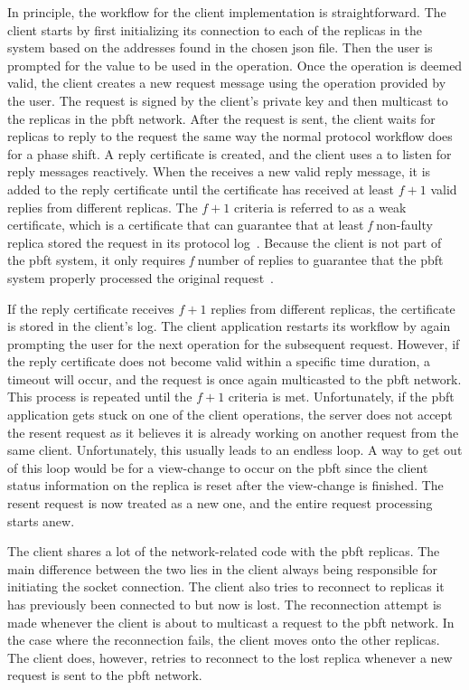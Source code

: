 In principle, the workflow for the client implementation is straightforward. The client starts by first initializing its connection to each of the replicas in the system based on the addresses found in the chosen \ac{json} file. Then the user is prompted for the value to be used in the operation. Once the operation is deemed valid, the client creates a new request message using the operation provided by the user. The request is signed by the client’s private key and then multicast to the replicas in the \ac{pbft} network. After the request is sent, the client waits for replicas to reply to the request the same way the normal protocol workflow does for a phase shift. A reply certificate is created, and the client uses a  to listen for reply messages reactively. When the  receives a new valid reply message, it is added to the reply certificate until the certificate has received at least $f+1$ valid replies from different replicas. The $f+1$ criteria is referred to as a weak certificate, which is a certificate that can guarantee that at least \emph{f} non-faulty replica stored the request in its protocol log~\cites[p.~9]{PAPER:PBFTRecovery}[p.~2]{PAPER:DPBFT}. Because the client is not part of the \ac{pbft} system, it only requires \emph{f} number of replies to guarantee that the \ac{pbft} system properly processed the original request~\cites[p.~3]{PAPER:OGPBFT}[p.~9]{PAPER:PBFTRecovery}.

If the reply certificate receives $f+1$ replies from different replicas, the certificate is stored in the client’s log. The client application restarts its workflow by again prompting the user for the next operation for the subsequent request. However, if the reply certificate does not become valid within a specific time duration, a timeout will occur, and the request is once again multicasted to the \ac{pbft} network. This process is repeated until the $f+1$ criteria is met. Unfortunately, if the \ac{pbft} application gets stuck on one of the client operations, the server does not accept the resent request as it believes it is already working on another request from the same client.  Unfortunately, this usually leads to an endless loop. A way to get out of this loop would be for a view-change to occur on the \ac{pbft} since the client status information on the replica is reset after the view-change is finished. The resent request is now treated as a new one, and the entire request processing starts anew.

The client shares a lot of the network-related code with the \ac{pbft} replicas. The main difference between the two lies in the client always being responsible for initiating the socket connection. The client also tries to reconnect to replicas it has previously been connected to but now is lost. The reconnection attempt is made whenever the client is about to multicast a request to the \ac{pbft} network. In the case where the reconnection fails, the client moves onto the other replicas. The client does, however, retries to reconnect to the lost replica whenever a new
request is sent to the \ac{pbft} network. 

